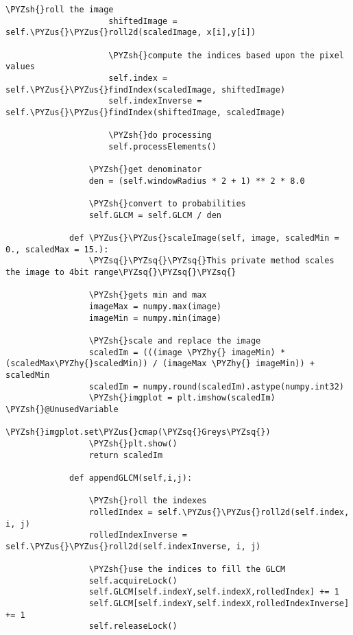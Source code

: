 \documentclass[11pt]{article}
\def\PYZsq{\textquotesingle}%
\def\PYZus{\char`\_}
\def\PYZsh{\char`\#}
\def\PYZhy{\char`\-}
\def\PYZsq{\char`\'}
\begin{document}
\begin{Verbatim}[commandchars=\\\{\}]
                     \PYZsh{}roll the image
                     shiftedImage = self.\PYZus{}\PYZus{}roll2d(scaledImage, x[i],y[i])
                    
                     \PYZsh{}compute the indices based upon the pixel values
                     self.index = self.\PYZus{}\PYZus{}findIndex(scaledImage, shiftedImage)
                     self.indexInverse = self.\PYZus{}\PYZus{}findIndex(shiftedImage, scaledImage)
                     
                     \PYZsh{}do processing
                     self.processElements()                    
                 
                 \PYZsh{}get denominator
                 den = (self.windowRadius * 2 + 1) ** 2 * 8.0
                    
                 \PYZsh{}convert to probabilities
                 self.GLCM = self.GLCM / den
                            
             def \PYZus{}\PYZus{}scaleImage(self, image, scaledMin = 0., scaledMax = 15.):
                 \PYZsq{}\PYZsq{}\PYZsq{}This private method scales the image to 4bit range\PYZsq{}\PYZsq{}\PYZsq{}
                 
                 \PYZsh{}gets min and max
                 imageMax = numpy.max(image)
                 imageMin = numpy.min(image)
                 
                 \PYZsh{}scale and replace the image
                 scaledIm = (((image \PYZhy{} imageMin) * (scaledMax\PYZhy{}scaledMin)) / (imageMax \PYZhy{} imageMin)) + scaledMin
                 scaledIm = numpy.round(scaledIm).astype(numpy.int32)   
                 \PYZsh{}imgplot = plt.imshow(scaledIm) \PYZsh{}@UnusedVariable
                 \PYZsh{}imgplot.set\PYZus{}cmap(\PYZsq{}Greys\PYZsq{})
                 \PYZsh{}plt.show()
                 return scaledIm
                 
             def appendGLCM(self,i,j):
                 
                 \PYZsh{}roll the indexes
                 rolledIndex = self.\PYZus{}\PYZus{}roll2d(self.index, i, j)
                 rolledIndexInverse = self.\PYZus{}\PYZus{}roll2d(self.indexInverse, i, j)
                             
                 \PYZsh{}use the indices to fill the GLCM
                 self.acquireLock()
                 self.GLCM[self.indexY,self.indexX,rolledIndex] += 1
                 self.GLCM[self.indexY,self.indexX,rolledIndexInverse] += 1
                 self.releaseLock()
             

\end{Verbatim}
\end{document}
